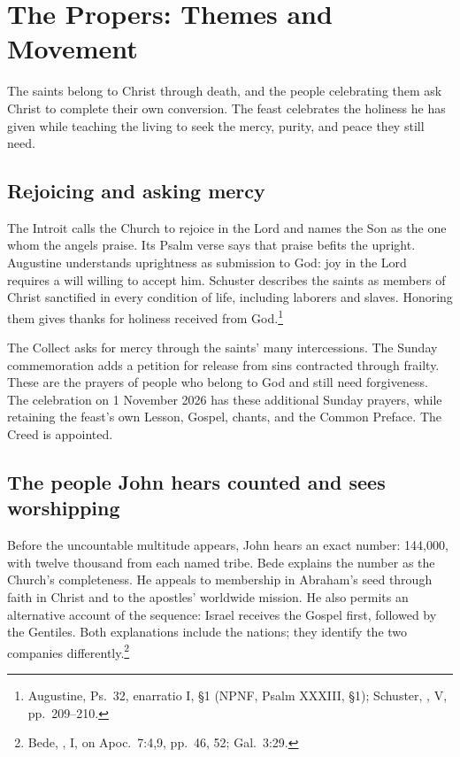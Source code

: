 \section{The Propers: Themes and Movement}
The saints belong to Christ through death, and the people celebrating them
ask Christ to complete their own conversion. The feast celebrates the
holiness he has given while teaching the living to seek the mercy, purity,
and peace they still need.

\subsection{Rejoicing and asking mercy}
The Introit calls the Church to rejoice in the Lord and names the Son as
the one whom the angels praise. Its Psalm verse says that praise befits
the upright. Augustine understands uprightness as submission to God:
joy in the Lord requires a will willing to accept him. Schuster describes
the saints as members of Christ sanctified in every condition of life,
including laborers and slaves. Honoring them gives thanks for holiness
received from God.\footnote{Augustine, Ps.~32, enarratio I, \S1
(NPNF, Psalm XXXIII, \S1); Schuster, , V,
pp.~209--210.}

The Collect asks for mercy through the saints' many intercessions. The
Sunday commemoration adds a petition for release from sins contracted
through frailty. These are the prayers of people who belong to God and
still need forgiveness. The celebration on 1 November 2026 has these
additional Sunday prayers, while retaining the feast's own Lesson,
Gospel, chants, and the Common Preface. The Creed is appointed.

\subsection{The people John hears counted and sees worshipping}
Before the uncountable multitude appears, John hears an exact number:
144,000, with twelve thousand from each named tribe. Bede explains the
number as the Church's completeness. He appeals to membership in Abraham's
seed through faith in Christ and to the apostles' worldwide mission.
He also permits an alternative account of the sequence: Israel receives
the Gospel first, followed by the Gentiles. Both explanations include the
nations; they identify the two companies differently.\footnote{Bede,
, I, on Apoc.~7:4,9,
pp.~46, 52; Gal.~3:29.}

